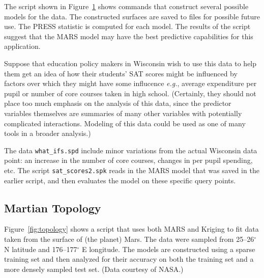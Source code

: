 \documentclass{article}
\begin{document}
The script shown in Figure~\ref{fig:test_scores} shows commands that construct several possible models for the data.  The constructed surfaces are saved to files for possible future use.  The PRESS statistic is computed for each model.  The results of the script suggest that the MARS model may have the best predictive capabilities for this application. 
\begin{figure}[htbp]
  \centering
  \begin{bigbox}
	\begin{small}
 	\end{small}
  \end{bigbox}
   \label{fig:test_scores}
\end{figure}

Suppose that education policy makers in Wisconsin wish to use this data to help them get an idea of how their students' SAT scores might be influenced by factors over which they might have some influcence {\em e.g.}, average expenditure per pupil or number of core courses taken in high school.  (Certainly, they should not place too much emphasis on the analysis of this data, since the predictor variables themselves are summaries of many other variables with potentially complicated interactions.  Modeling of this data could be used as one of many tools in a broader analysis.)  

The data \texttt{what\_ifs.spd} include minor variations from the actual Wisconsin data point: an increase in the number of core courses, changes in per pupil spending, etc.  The script \texttt{sat\_scores2.spk} reads in the MARS model that was saved in the earlier script, and then evaluates the model on these specific query points.   

\begin{figure}[htbp]
  \centering
  \begin{bigbox}
	\begin{small}
	
 	\end{small}
  \end{bigbox}
   \label{fig:test_scores2}
\end{figure}

\pagebreak
\subsection {Martian Topology}

Figure~\ref{fig:topology} shows a script that uses both MARS and Kriging to fit data taken from the surface of (the planet) Mars.  The data were sampled from 25--26$^{\circ}$ N latitude and 176--177$^{\circ}$ E longitude. The models are constructed using a sparse training set and then analyzed for their accuracy on both the training set and a more densely sampled test set.  (Data courtesy of NASA.)
\end{document}
